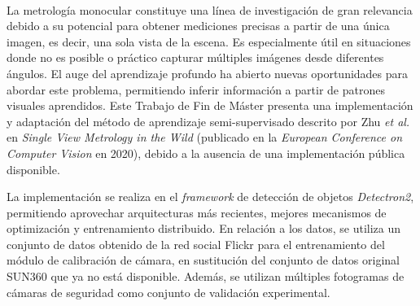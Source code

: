 \chapter*{}

% 


\thispagestyle{empty}

\begin{center}
{\large\bfseries \myTitle}\\
\end{center}
\begin{center}
\myName\\
\end{center}

\\

\\
La metrología monocular constituye una línea de investigación de gran relevancia debido a su potencial
para obtener mediciones precisas a partir de una única imagen, es decir, una sola vista de la escena.
Es especialmente útil en situaciones donde no es posible o práctico capturar múltiples imágenes
desde diferentes ángulos. El auge del aprendizaje profundo ha abierto nuevas oportunidades para abordar
este problema, permitiendo inferir información a partir de patrones visuales aprendidos.
Este Trabajo de Fin de Máster presenta una implementación y adaptación del método de aprendizaje semi-supervisado descrito por Zhu \emph{et al.}
en \emph{Single View Metrology in the Wild} (publicado en la \emph{European Conference on Computer Vision} en 2020), debido a la ausencia de una implementación pública disponible.
\smallskip

La implementación se realiza en el \emph{framework} de detección de objetos \emph{Detectron2},
permitiendo aprovechar arquitecturas más recientes, mejores mecanismos de optimización y entrenamiento distribuido.
En relación a los datos, se utiliza un conjunto de datos obtenido de la red social Flickr
para el entrenamiento del módulo de calibración de cámara, en sustitución del
conjunto de datos original SUN360 que ya no está disponible.
Además, se utilizan múltiples fotogramas de cámaras de seguridad
como conjunto de validación experimental.
\smallskip

